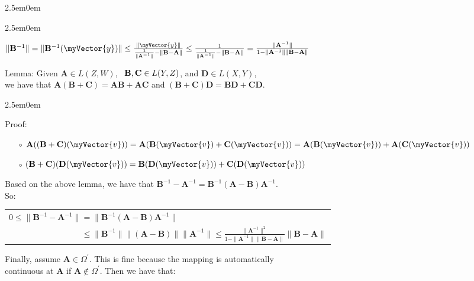 \documentclass{book}
\newcommand{\hFour}{%
   \color{Cerulean}
   \fontsize{12}{14}\selectfont%
}
\newenvironment{myIndent}{%
   \begin{adjustwidth}{2.5em}{0em}%
}{%
   \end{adjustwidth}%
}
\newcommand{\uuline}[2][.]{%
{\vphantom{a}\color{#1}%
\rlap{\rule[-0.18em]{\widthof{#2}}{0.06em}}%
\rlap{\rule[-0.32em]{\widthof{#2}}{0.06em}}}%
#2}
\newcommand{\myHS}{ \hspace{0.5em}}
\newcommand{\retTwo}{\hfill\bigbreak}
\newcommand{\mVec}[1]{\myVector{#1}}
\newcommand{\mMat}[1]{\mathbf{#1}}
\begin{document}
{\begin{myIndent}
\begin{itemize}
{\begin{myIndent}
         {\center $ \|\mMat{B}^{-1}\| = \|\mMat{B}^{-1}(\mVec{y})\| \leq \frac{\|\mVec{y}\|}{\frac{1}{\|\mMat{A}^{-1}\|} - \|\mMat{B} - \mMat{A}\|} \leq \frac{1}{\frac{1}{\|\mMat{A}^{-1}\|} - \|\mMat{B} - \mMat{A}\|} = \frac{\|\mMat{A}^{-1}\|}{1 - \|\mMat{A}^{-1}\|\|\mMat{B} - \mMat{A}\|}$ \retTwo\par}

         \uuline{Lemma}: Given $\mMat{A} \in L(Z, W)$, $\myHS\mMat{B}, \mMat{C} \in L(Y, Z)$, and $\mMat{D} \in L(X, Y)$,\\ we have that $\mMat{A}(\mMat{B} + \mMat{C}) = \mMat{A}\mMat{B} + \mMat{A}\mMat{C}$ and $(\mMat{B} + \mMat{C})\mMat{D} = \mMat{B}\mMat{D} + \mMat{C}\mMat{D}$.
         {\begin{myIndent}\hFour
            Proof:
            \begin{itemize}
               \item[$\circ$] $\mMat{A}((\mMat{B} + \mMat{C})(\mVec{v})) = \mMat{A}(\mMat{B}(\mVec{v}) + \mMat{C}(\mVec{v})) = \mMat{A}(\mMat{B}(\mVec{v})) + \mMat{A}(\mMat{C}(\mVec{v}))$
               \item[$\circ$] $ (\mMat{B} + \mMat{C})(\mMat{D}(\mVec{v})) =  \mMat{B}(\mMat{D}(\mVec{v})) + \mMat{C}(\mMat{D}(\mVec{v}))$\\
            \end{itemize}
         \end{myIndent}}

         Based on the above lemma, we have that $\mMat{B}^{-1} - \mMat{A}^{-1} = \mMat{B}^{-1}(\mMat{A} - \mMat{B})\mMat{A}^{-1}$.\\ So:\\ [-26pt]
         \begin{center}
            \begin{tabular}{l}
               $0 \leq \|\mMat{B}^{-1} - \mMat{A}^{-1}\| = \|\mMat{B}^{-1}(\mMat{A} - \mMat{B})\mMat{A}^{-1}\|$ \\
               $\phantom{0 \leq \|\mMat{B}^{-1} - \mMat{A}^{-1}\|} \leq \|\mMat{B}^{-1}\|\|(\mMat{A} - \mMat{B})\|\|\mMat{A}^{-1}\| \leq \frac{\|\mMat{A}^{-1}\|^2}{1 - \|\mMat{A}^{-1}\|\|\mMat{B} - \mMat{A}\|}\|\mMat{B} - \mMat{A}\|$
            \end{tabular}\retTwo
         \end{center}

         Finally, assume $\mMat{A} \in \Omega^\prime$. This is fine because the mapping is automatically\\ continuous at $\mMat{A}$ if $\mMat{A} \notin \Omega^\prime$. Then we have that:
         

\end{myIndent}}
\end{itemize}
\end{myIndent}}
\end{document}
